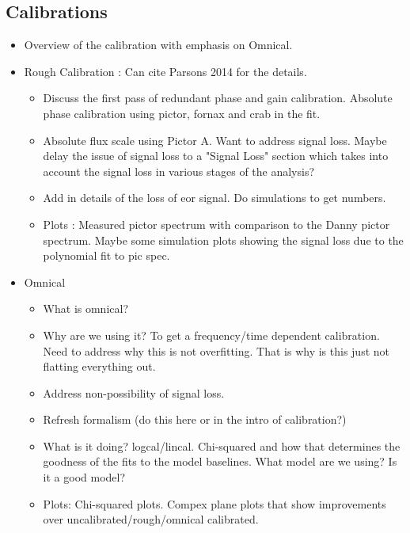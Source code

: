 \documentclass[twocolumn,numberedappendix]{emulateapj}
\begin{document}
\subsection{Calibrations}
\begin{itemize}
    \item{Overview of the calibration with emphasis on Omnical.}
    \item{Rough Calibration : Can cite Parsons 2014 for the details.}
    \begin{itemize}
        \item{Discuss the first pass of redundant phase and gain calibration.
              Absolute phase calibration using pictor, fornax and crab in the
              fit.}
        \item{Absolute flux scale using Pictor A. Want to address signal loss.
             Maybe delay the issue of signal loss to a "Signal Loss" section
             which takes into account the signal loss in various stages of the 
             analysis?}
        \item{Add in details of the loss of eor signal. Do simulations to get
              numbers. }
        \item{Plots : Measured pictor spectrum with comparison to the Danny
              pictor spectrum. Maybe some simulation plots showing the signal
              loss due to the polynomial fit to pic spec.}
    \end{itemize}
    \item{Omnical}
    \begin{itemize}
        \item{What is omnical?}
        \item{Why are we using it? To get a frequency/time dependent
calibration. Need to address why this is not overfitting. That is why is this
just not flatting everything out.}
        \item{Address non-possibility of signal loss.}
        \item{Refresh formalism (do this here or in the intro of calibration?)}
        \item{What is it doing? logcal/lincal. Chi-squared and how that
              determines the goodness of the fits to the model baselines. What
model are we using? Is it a good model?}
        \item{Plots: Chi-squared plots. Compex plane plots that show
              improvements over uncalibrated/rough/omnical calibrated.}
    \end{itemize} 
\end{itemize}
\end{document}
